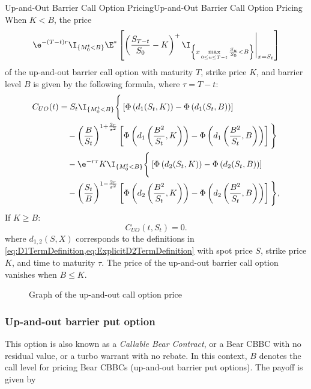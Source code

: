 \begin{prop}{Up-and-Out Barrier Call Option Pricing}{Up-and-Out Barrier Call Option Pricing}
    When $K < B$, the price
    \begin{equation}
        \e^{-(T-t)r} \I_{\{M_0^t < B\}} \E^* \left[ \left( \frac{S_{T-t}}{S_0} - K \right)^+ \I_{\left\{ x \max\limits_{0 \le u \le T-t} \frac{S_u}{S_0} < B \right\}} \Bigg|_{x=S_t} \right]
    \end{equation}
    of the up-and-out barrier call option with maturity $T$, strike price $K$, and barrier level $B$ is given by the following formula, where $\tau = T-t$:
    \begin{align}
        C_{UO}(t) &= S_t \I_{\{M_0^t < B\}} \Bigg\{ \left[ \Phi \left( d_1(S_t, K) \right) - \Phi \left( d_1(S_t, B) \right) \right] \nonumber \\
        &\quad - \left( \frac{B}{S_t} \right)^{1+\frac{2r}{\sigma^2}} \left[ \Phi \left( d_1\left(\frac{B^2}{S_t}, K\right) \right) - \Phi \left( d_1\left(\frac{B^2}{S_t}, B\right) \right) \right] \Bigg\} \nonumber \\
        &\quad - \e^{-r\tau} K \I_{\{M_0^t < B\}} \Bigg\{ \left[ \Phi \left( d_2(S_t, K) \right) - \Phi \left( d_2(S_t, B) \right) \right] \nonumber \\
        &\quad - \left( \frac{S_t}{B} \right)^{1-\frac{2r}{\sigma^2}} \left[ \Phi \left( d_2\left(\frac{B^2}{S_t}, K\right) \right) - \Phi \left( d_2\left(\frac{B^2}{S_t}, B\right) \right) \right] \Bigg\},
    \end{align}
    If $K \ge B$:
    \begin{equation}
        C_{UO}(t, S_t) = 0.
    \end{equation}
    where $d_{1,2}(S, X)$ corresponds to the definitions in \cref{eq:D1TermDefinition,eq:ExplicitD2TermDefinition} with spot price $S$, strike price $K$, and time to maturity $\tau$. The price of the up-and-out barrier call option vanishes when $B \le K$.
\end{prop}

\begin{figure}[H]
    \centering
    
    \caption{Graph of the up-and-out call option price}
    \label{fig:upAndOutCallBarrierSurface}
\end{figure}

\clearpage
\subsubsection{Up-and-out barrier put option}
This option is also known as a \textit{Callable Bear Contract}, or a Bear CBBC with no residual value, or a turbo warrant with no rebate. In this context, $B$ denotes the call level for pricing Bear CBBCs (up-and-out barrier put options). The payoff is given by

